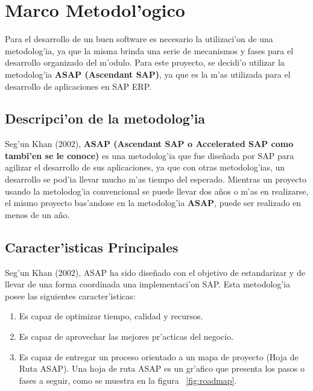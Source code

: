 \chapter{Marco Metodol'ogico} \label{chap:metodologia}
Para el desarrollo de un buen software es necesario la utilizaci'on de una metodolog'ia, ya que la misma brinda una serie de mecanismos y fases para el desarrollo organizado del m'odulo.
\newline
\newline
Para este proyecto, se decidi'o utilizar la metodolog'ia \textbf{ASAP (Ascendant SAP)}, ya que es la m'as utilizada para el desarrollo de aplicaciones en SAP ERP.
\section{Descripci'on de la metodolog'ia}
Seg'un Khan (2002), \textbf{ASAP (Ascendant SAP o Accelerated SAP como tambi'en se le conoce)} es una metodolog'ia que fue dise\~nada por SAP para agilizar el desarrollo de sus aplicaciones, ya que con otras metodolog'ias, un desarrollo se pod'ia llevar mucho m'as tiempo del esperado. Mientras un proyecto usando la metolodog'ia convencional se puede llevar dos a\~nos o m'as en realizarse, el mismo proyecto bas'andose en la metodolog'ia \textbf{ASAP}, puede ser realizado en menos de un a\~no. 

\section{Caracter'isticas Principales}
Seg'un Khan (2002), ASAP ha sido dise\~nado con el objetivo de estandarizar y de llevar de una forma coordinada una implementaci'on SAP.  Esta metodolog'ia posee las siguientes caracter'isticas:
\begin{enumerate}
\item Es capaz de optimizar tiempo, calidad y recursos.
\item Es capaz de aprovechar las mejores pr'acticas del negocio.
\item Es capaz de entregar un proceso orientado a un mapa de proyecto (Hoja de Ruta ASAP). Una hoja de ruta ASAP es un gr'afico que presenta los pasos o fases a seguir, como se muestra en la figura ~\ref{fig:roadmap}.

\end{enumerate}


